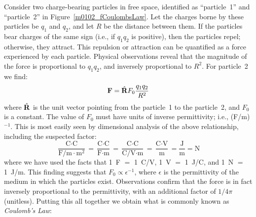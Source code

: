 

\label{m0102_Coulombs_Law} %

Consider two charge-bearing particles in free space, identified as ``particle~1'' and ``particle~2'' in Figure~\ref{m0102_fCoulombsLaw}.
Let the charges borne by these particles be $q_1$ and $q_2$, and let $R$  be the distance between them.
If the particles bear charges of the same sign (i.e., if $q_1q_2$ is positive), then the particles repel; otherwise, they attract.
This repulsion or attraction can be quantified as a force experienced by each particle.  
Physical observations reveal that the magnitude of the force is proportional to $q_1q_2$, and inversely proportional to $R^2$.
For particle~2 we find:
%
\begin{equation}
{\bf F} = \hat{\bf R} F_0 \frac{q_1 q_2}{R^2}
\end{equation}
%
where 
$\hat{\bf R}$ is the unit vector pointing from the particle~1 to the particle~2, and
$F_0$ is a constant.  
The value of $F_0$ must have units of inverse permittivity; i.e., 
(F/m)$^{-1}$.
This is most easily seen by dimensional analysis of the above relationship, including the suspected factor:
\begin{equation}
\frac{\mbox{C}\cdot\mbox{C}}{\mbox{F/m}\cdot\mbox{m}^2} 
= \frac{\mbox{C}\cdot\mbox{C}}{\mbox{F}\cdot\mbox{m}} 
= \frac{\mbox{C}\cdot\mbox{C}}{\mbox{C/V}\cdot\mbox{m}}
= \frac{\mbox{C}\cdot\mbox{V}}{\mbox{m}}
= \frac{\mbox{J}}{\mbox{m}}
= \mbox{N}
\nonumber
\end{equation}
%
where we have used the facts that 
1~F $=$ 1~C/V,
1~V $=$ 1~J/C, and
1~N $=$ 1~J/m.
%
This finding suggests that $F_0\propto\epsilon^{-1}$, where $\epsilon$ is the permittivity of the medium in which the particles exist.
Observations confirm that the force is in fact inversely proportional to the permittivity, with an additional factor of $1/4\pi$ (unitless).  
Putting this all together we obtain what is commonly known as \emph{Coulomb's Law}:
